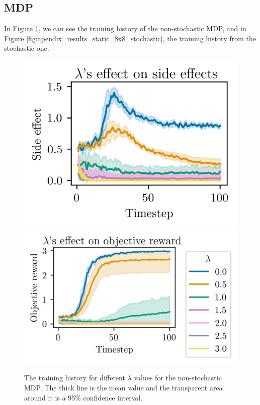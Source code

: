\documentclass[12pt,A4]{report}
\theoremstyle{definition}
\begin{document}
\begin{appendices}
\section{MDP}
  In Figure \ref{fig:apendix_results_static_8x8}, we can see the training history of the non-stochastic MDP, and in Figure \ref{fig:apendix_results_static_8x8_stochastic}, the training history from the stochastic one.
\begin{figure}[H]
  \centering
  \includegraphics{"./figures/static_8x8_side_effects.png"}
  \includegraphics{"./figures/static_8x8_objective_reward.png"}
  \caption{The training history for different $\lambda$ values for the non-stochastic MDP. The thick line is the mean value and the transparent area around it is a 95\% confidence interval.}
  \label{fig:apendix_results_static_8x8}
\end{figure}


\end{appendices}
\end{document}
